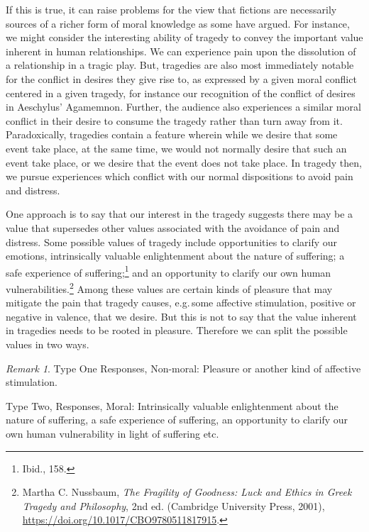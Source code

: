 \documentclass[phdthesis,12pt,final]{wuthesis}
\theoremstyle{definition}
\theoremstyle{definition}
\theoremstyle{definition}
\theoremstyle{definition}
\theoremstyle{remark}
\newtheorem*{remark}{Remark}
\begin{document}
If this is true, it can raise problems for the view that fictions are necessarily sources of a richer form of moral knowledge as some have argued. For instance, we might consider the interesting ability of tragedy to convey the important value inherent in human relationships. We can experience pain upon the dissolution of a relationship in a tragic play. But, tragedies are also most immediately notable for the conflict in desires they give rise to, as expressed by a given moral conflict centered in a given tragedy, for instance our recognition of the conflict of desires in Aeschylus' Agamemnon. Further, the audience also experiences a similar moral conflict in their desire to consume the tragedy rather than turn away from it. Paradoxically, tragedies contain a feature wherein while we desire that some event take place, at the same time, we would not normally desire that such an event take place, or we desire that the event does not take place. In tragedy then, we pursue experiences which conflict with our normal dispositions to avoid pain and distress.

One approach is to say that our interest in the tragedy suggests there may be a value that supersedes other values associated with the avoidance of pain and distress. Some possible values of tragedy include opportunities to clarify our emotions, intrinsically valuable enlightenment about the nature of suffering; a safe experience of suffering;\footnote{Ibid., 158.} and an opportunity to clarify our own human vulnerabilities.\footnote{Martha C. Nussbaum, \emph{The {Fragility} of {Goodness}: {Luck} and {Ethics} in {Greek Tragedy} and {Philosophy}}, 2nd ed. (Cambridge University Press, 2001), \url{https://doi.org/10.1017/CBO9780511817915}.} Among these values are certain kinds of pleasure that may mitigate the pain that tragedy causes, e.g.\,some affective stimulation, positive or negative in valence, that we desire. But this is not to say that the value inherent in tragedies needs to be rooted in pleasure. Therefore we can split the possible values in two ways.

\begin{remark}
Type One Responses, Non-moral: Pleasure or another kind of affective stimulation.

Type Two, Responses, Moral: Intrinsically valuable enlightenment about the nature of suffering, a safe experience of suffering, an opportunity to clarify our own human vulnerability in light of suffering etc.
\end{remark}
\end{document}
